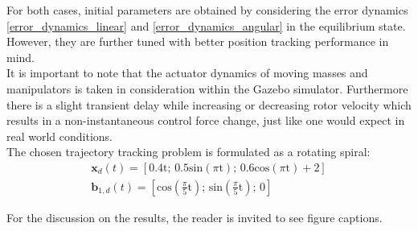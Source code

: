 For both cases, initial parameters are obtained by considering the error dynamics \eqref{error_dynamics_linear} and \eqref{error_dynamics_angular} in the equilibrium state. However, they are further tuned with better position tracking performance in mind.\\
It is important to note that the actuator dynamics of moving masses and manipulators is taken in consideration within the Gazebo simulator. Furthermore there is a slight transient delay while increasing or decreasing rotor velocity which results in a non-instantaneous control force change, just like one would expect in real world conditions. \\
\noindent The chosen trajectory tracking problem is formulated as a rotating spiral:
\begin{gather*}
	\textbf{x}_d(t) = [0.4\text{t}; \, 0.5\text{sin}(\pi\text{t}); \, 0.6\text{cos}(\pi\text{t}) + 2] \\
	\textbf{b}_{1,d}(t) = [\text{cos}\left(\frac{\pi}{5}\text{t}\right); \, \text{sin}\left(\frac{\pi}{5}\text{t}\right); \, 0]
\end{gather*}

For the discussion on the results, the reader is invited to see figure captions. 

